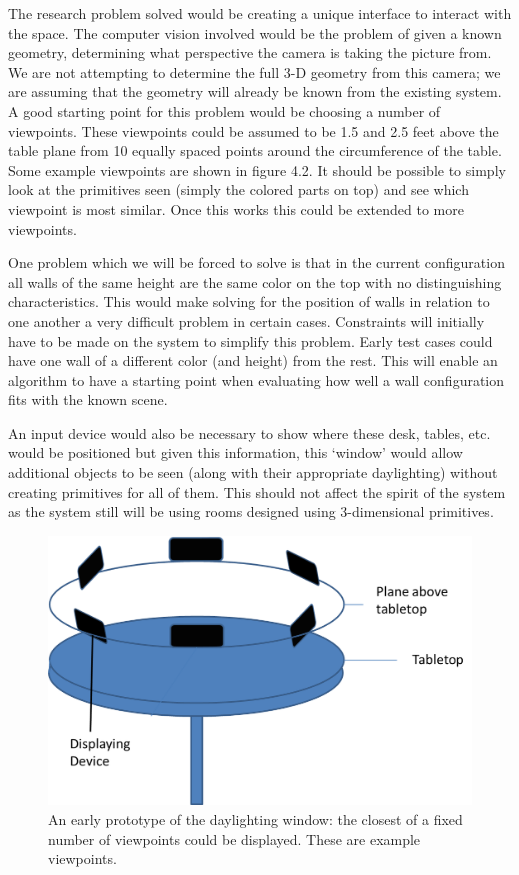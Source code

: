 The research problem solved would be creating a unique interface to interact with the space.  The computer vision involved would be the problem of given a known geometry, determining what perspective the camera is taking the picture from.  We are not attempting to determine the full 3-D geometry from this camera; we are assuming that the geometry will already be known from the existing system.  A good starting point for this problem would be choosing a number of viewpoints.  These viewpoints could be assumed to be 1.5 and 2.5 feet above the table plane from 10 equally spaced points around the circumference of the table.  Some example viewpoints are shown in figure 4.2.  It should be possible to simply look at the primitives seen (simply the colored parts on top) and see which viewpoint is most similar.  Once this works this could be extended to more viewpoints. 

One problem which we will be forced to solve is that in the current configuration all walls of the same height are the same color on the top with no distinguishing characteristics.  This would make solving for the position of walls in relation to one another a very difficult problem in certain cases.  Constraints will initially have to be made on the system to simplify this problem.  Early test cases could have one wall of a different color (and height) from the rest.  This will enable an algorithm to have a starting point when evaluating how well a wall configuration fits with the known scene.

An input device would also be necessary to show where these desk, tables, etc. would be positioned but given this information, this `window' would allow additional objects to be seen (along with their appropriate daylighting) without creating primitives for all of them.  This should not affect the spirit of the system as the system still will be using rooms designed using 3-dimensional primitives. \\


\begin{figure}[t]
\includegraphics[width=.75\textwidth]{images/example_display_layout.png}
\caption[Example prototype of the daylighting window]{An early prototype of the daylighting window: the closest of a fixed number of viewpoints could be displayed.  These are example viewpoints.}

\end{figure}

